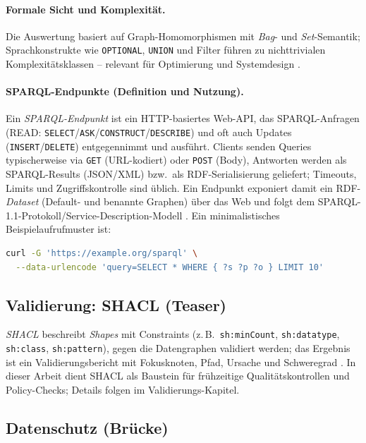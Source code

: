 \paragraph{Formale Sicht und Komplexität.}
Die Auswertung basiert auf Graph-Homomorphismen mit \emph{Bag}- und \emph{Set}-Semantik; Sprachkonstrukte wie \texttt{OPTIONAL}, \texttt{UNION} und Filter führen zu nichttrivialen Komplexitätsklassen -- relevant für Optimierung und Systemdesign \cite{perezGutierrezSparql}.

\paragraph{SPARQL-Endpunkte (Definition und Nutzung).}
Ein \emph{SPARQL-Endpunkt} ist ein HTTP-basiertes Web-API, das SPARQL-Anfragen (READ: \texttt{SELECT}/\texttt{ASK}/\texttt{CONSTRUCT}/\texttt{DESCRIBE}) und oft auch Updates (\texttt{INSERT}/\texttt{DELETE}) entgegennimmt und ausführt. Clients senden Queries typischerweise via \texttt{GET} (URL-kodiert) oder \texttt{POST} (Body), Antworten werden als SPARQL-Results (JSON/XML) bzw.\ als RDF-Serialisierung geliefert; Timeouts, Limits und Zugriffskontrolle sind üblich. Ein Endpunkt exponiert damit ein RDF-\emph{Dataset} (Default- und benannte Graphen) über das Web und folgt dem SPARQL-1.1-Protokoll/Service-Description-Modell \cite{SPARQL11Overview}. Ein minimalistisches Beispielaufrufmuster ist:
\begin{lstlisting}[language=bash]
curl -G 'https://example.org/sparql' \
  --data-urlencode 'query=SELECT * WHERE { ?s ?p ?o } LIMIT 10'
\end{lstlisting}

\subsection{Validierung: SHACL (Teaser)}

\emph{SHACL} beschreibt \emph{Shapes} mit Constraints (z.\,B.\ \texttt{sh:minCount}, \texttt{sh:datatype}, \texttt{sh:class}, \texttt{sh:pattern}), gegen die Datengraphen validiert werden; das Ergebnis ist ein Validierungsbericht mit Fokusknoten, Pfad, Ursache und Schweregrad \cite{SHACL12}. In dieser Arbeit dient SHACL als Baustein für frühzeitige Qualitätskontrollen und Policy-Checks; Details folgen im Validierungs-Kapitel.


\subsection{Datenschutz (Brücke)}

